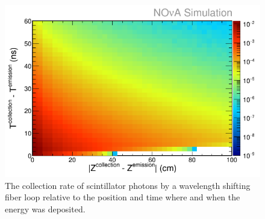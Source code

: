 \begin{figure}
\includegraphics[width=1.0\textwidth]{figures/Coll_rate.png}
\centering
\caption{The collection rate of scintillator photons by a wavelength shifting fiber loop relative to the position 
	and time where and when the energy was deposited.} \label{fig:Coll_rate}
\end{figure}

